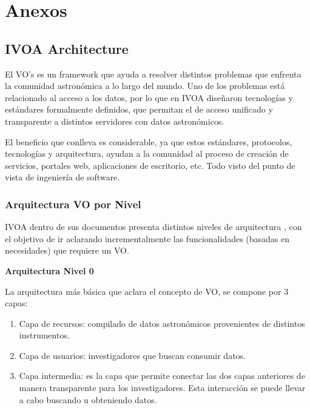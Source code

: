 \section{Anexos}
\subsection{IVOA Architecture}
El VO's es un framework que ayuda a resolver distintos
problemas que enfrenta la comunidad astronómica a lo largo del mundo.  Uno de
los problemas está relacionado al acceso a los datos, por lo que en IVOA
diseñaron tecnologías y estándares formalmente definidos, que permitan el de
acceso unificado y transparente a distintos servidores con datos astronómicos.

El beneficio que conlleva es considerable, ya que estos
estándares, protocolos, tecnologías y arquitectura, ayudan a la comunidad al
proceso de creación de servicios, portales web, aplicaciones de escritorio,
etc. Todo visto del punto de vista de ingeniería de software.

\subsubsection{Arquitectura VO por Nivel}

IVOA dentro de sus documentos presenta distintos niveles de arquitectura
\cite{ivoa_arch}, con el objetivo de ir aclarando incrementalmente las
funcionalidades (basadas en necesidades) que requiere un VO.

\textbf{Arquitectura Nivel 0} %


La arquitectura más básica que aclara el concepto de VO, se compone por 3
capas:

\begin{enumerate}
    \item Capa de recursos:
          compilado de datos astronómicos provenientes de distintos instrumentos.
    \item Capa de usuarios:
          investigadores que buscan consumir datos.
    \item Capa intermedia:
          es la capa que permite conectar las dos
          capas anteriores de manera transparente para los investigadores.
          Esta interacción se puede llevar a cabo buscando u obteniendo datos.
\end{enumerate}

